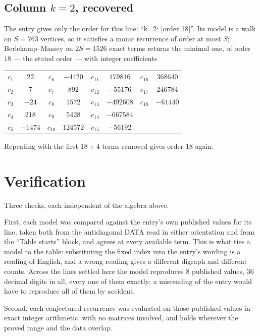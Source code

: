 \documentclass[11pt,a4paper]{article}
\theoremstyle{plain}
\theoremstyle{definition}
\begin{document}
\subsection*{Column $k=2$, recovered}
The entry gives only the order for this line: ``k=2: [order 18]''. Its model is a walk on
$S=763$ vertices, so it satisfies a monic recurrence of order at most $S$;
Berlekamp--Massey on $2S=1526$ exact terms returns the minimal one, of order
$18$ --- the stated order --- with integer coefficients
\begin{center}\small\begin{tabular}{cccccccc}
$c_{1}$ & $22$ & $c_{6}$ & $-4420$ & $c_{11}$ & $179816$ & $c_{16}$ & $368640$ \\
$c_{2}$ & $7$ & $c_{7}$ & $892$ & $c_{12}$ & $-55176$ & $c_{17}$ & $246784$ \\
$c_{3}$ & $-24$ & $c_{8}$ & $1572$ & $c_{13}$ & $-492608$ & $c_{18}$ & $-61440$ \\
$c_{4}$ & $218$ & $c_{9}$ & $5428$ & $c_{14}$ & $-667584$ &  &  \\
$c_{5}$ & $-1474$ & $c_{10}$ & $124572$ & $c_{15}$ & $-56192$ &  &  \\
\end{tabular}\end{center}
Repeating with the first $18+4$ terms removed gives order $18$ again.

\section{Verification}

Three checks, each independent of the algebra above.

First, each model was compared against the entry's own published values for its line, taken
both from the antidiagonal DATA read in either orientation and from the ``Table starts''
block, and agrees at every available term. This is what ties a model to the table:
substituting the fixed index into the entry's wording is a reading of English, and a wrong
reading gives a different digraph and different counts. Across the lines settled here the
model reproduces $8$ published values, $36$ decimal digits in all, every one of
them exactly; a misreading of the entry would have to reproduce all of them by accident.

Second, each conjectured recurrence was evaluated on those published values in exact
integer arithmetic, with no matrices involved, and holds wherever the proved range and the
data overlap.
\end{document}
